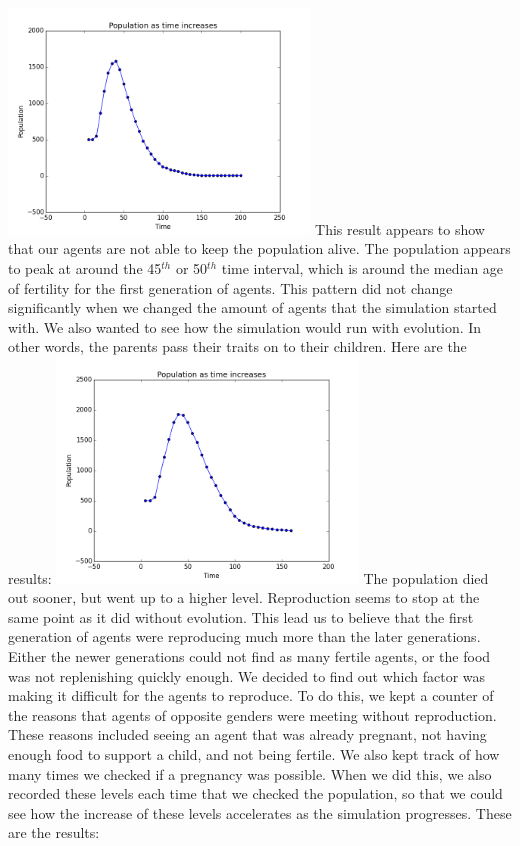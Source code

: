 \documentclass[11pt]{article}
\begin{document}
\begin{multicols}{2}
\includegraphics[width=80mm]{Population500noevo.png} \newline
This result appears to show that our agents are not able to keep the population alive. The population appears to peak at around the 45$^{th}$ or 50$^{th}$ time interval, which is around the median age of fertility for the first generation of agents. This pattern did not change significantly when we changed the amount of agents that the simulation started with. We also wanted to see how the simulation would run with evolution. In other words, the parents pass their traits on to their children. Here are the results: \newline
\includegraphics[width=80mm]{Population500.png} \newline
The population died out sooner, but went up to a higher level. \newline
Reproduction seems to stop at the same point as it did without evolution.
This lead us to believe that the first generation of agents were reproducing much more than the later generations. Either the newer generations could not find as many fertile agents, or the food was not replenishing quickly enough. We decided to find out which factor was making it difficult for the agents to reproduce.
\newline
To do this, we kept a counter of the reasons that agents of opposite genders were meeting without reproduction. These reasons included seeing an agent that was already pregnant, not having enough food to support a child, and not being fertile. We also kept track of how many times we checked if a pregnancy was possible. When we did this, we also recorded these levels each time that we checked the population, so that we could see how the increase of these levels accelerates as the simulation progresses. These are the results: \newline

\end{multicols}
\end{document}
